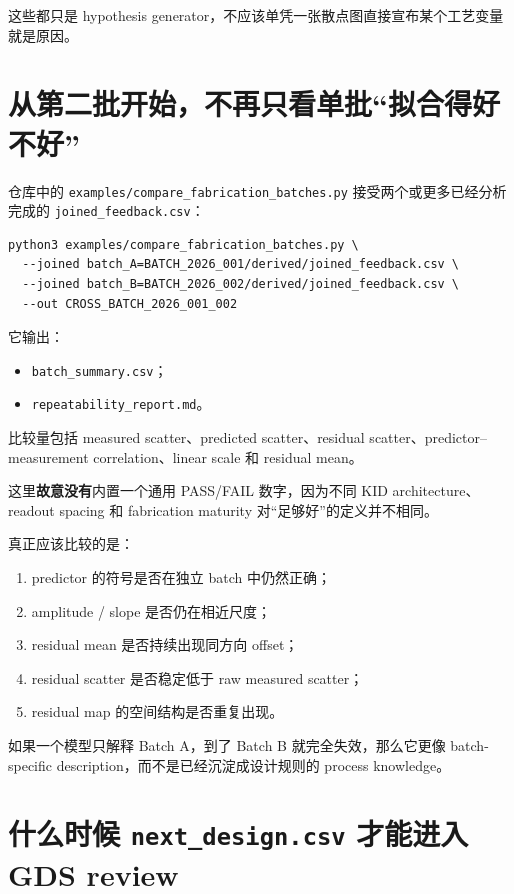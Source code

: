 这些都只是 hypothesis generator，不应该单凭一张散点图直接宣布某个工艺变量就是原因。

\section{从第二批开始，不再只看单批“拟合得好不好”}

仓库中的 \texttt{examples/compare\_fabrication\_batches.py} 接受两个或更多已经分析完成的 \texttt{joined\_feedback.csv}：

\begin{verbatim}
python3 examples/compare_fabrication_batches.py \
  --joined batch_A=BATCH_2026_001/derived/joined_feedback.csv \
  --joined batch_B=BATCH_2026_002/derived/joined_feedback.csv \
  --out CROSS_BATCH_2026_001_002
\end{verbatim}

它输出：

\begin{itemize}
  \item \texttt{batch\_summary.csv}；
  \item \texttt{repeatability\_report.md}。
\end{itemize}

比较量包括 measured scatter、predicted scatter、residual scatter、predictor--measurement correlation、linear scale 和 residual mean。

这里\textbf{故意没有}内置一个通用 PASS/FAIL 数字，因为不同 KID architecture、readout spacing 和 fabrication maturity 对“足够好”的定义并不相同。

真正应该比较的是：

\begin{enumerate}
  \item predictor 的符号是否在独立 batch 中仍然正确；
  \item amplitude / slope 是否仍在相近尺度；
  \item residual mean 是否持续出现同方向 offset；
  \item residual scatter 是否稳定低于 raw measured scatter；
  \item residual map 的空间结构是否重复出现。
\end{enumerate}

如果一个模型只解释 Batch A，到了 Batch B 就完全失效，那么它更像 batch-specific description，而不是已经沉淀成设计规则的 process knowledge。

\section{什么时候 \texttt{next\_design.csv} 才能进入 GDS review}

